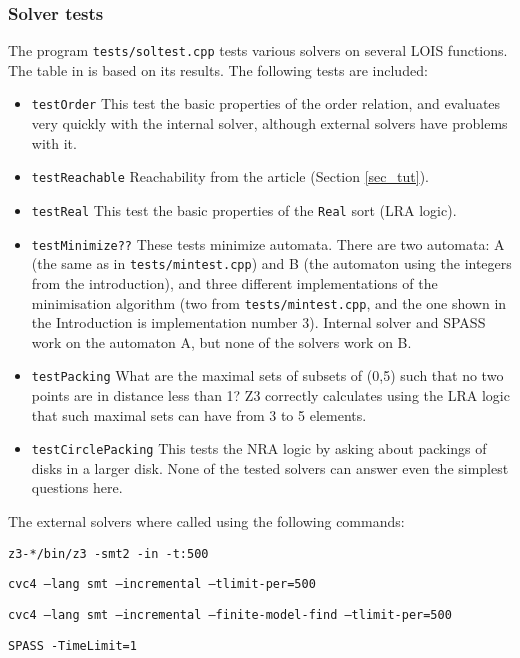 \subsubsection{Solver tests}\label{app:sol_tests}
The program \verb-tests/soltest.cpp- tests various solvers on several LOIS functions.
The table in \cite{lois-sat} is based on its results. The following tests
are included:

\begin{itemize}
\item \verb-testOrder- 
This test the basic properties of the order relation, and evaluates very quickly
with the internal solver, although external solvers have problems with it.

\item \verb-testReachable- 
Reachability from the article (Section \ref{sec_tut}).

\item \verb-testReal- 
This test the basic properties of the \verb-Real- sort (LRA logic).

\item \verb-testMinimize??-
These tests minimize automata. There are two automata: A (the same as in
\verb-tests/mintest.cpp-) and B (the automaton using the integers from the
introduction), and three different implementations of the minimisation algorithm
(two from \verb-tests/mintest.cpp-, and the one shown in the Introduction is
implementation number 3). Internal solver and SPASS work on the automaton A, but none of the solvers work on B.

\item \verb-testPacking-
What are the maximal sets of subsets of (0,5) such that no two points are in distance
less than 1? Z3 correctly calculates using the LRA logic that such maximal sets can
have from 3 to 5 elements.

\item \verb-testCirclePacking-
This tests the NRA logic by asking about packings of disks in a larger disk. 
None of the tested solvers can answer even the simplest questions here.
\end{itemize}

The external solvers where called using the following commands:


  \begin{description}\footnotesize
  \def\solver#1#2{\item [\bf #1:] {\tt #2}}
  \solver{Z3}{z3-*/bin/z3 -smt2 -in -t:500}
  \solver{CVC4}{cvc4 --lang smt --incremental --tlimit-per=500}
  \solver{CVC4*}{{cvc4 --lang smt --incremental --finite-model-find --tlimit-per=500}}
  \solver{SPASS}{SPASS -TimeLimit=1}
  \end{description}

